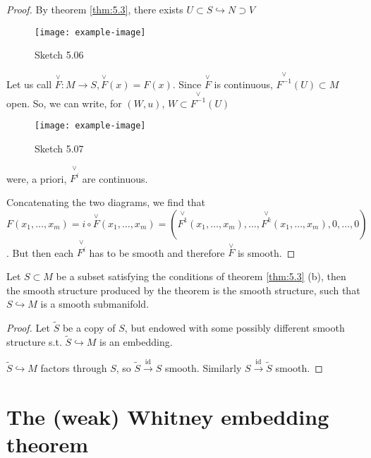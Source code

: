 \begin{proof} %
    By theorem \ref{thm:5.3}, there exists \(U\subset S\hookrightarrow N\supset V\)
    \begin{figure}[H]
        \centering
        \texttt{[image: example-image]}
        \caption{Sketch 5.06}
    \end{figure}
Let us call \(\stackrel{\vee}{F}:M\to S,\stackrel{\vee}{F}(x)=F(x)\). Since \(\stackrel{\vee}{F}\) 
is continuous, \(\stackrel{\vee}{F^{-1}}(U)\subset M\) open. So, we can write, for \((W,u)\), \(W\subset \stackrel{\vee}{F^{-1}}(U)\)
\begin{figure}[H]
    \centering
    \texttt{[image: example-image]}
    \caption{Sketch 5.07}
\end{figure}
were, a priori, \(\stackrel{\vee}{F^{i}}\) are continuous.

Concatenating the two diagrams, we find that \(F(x_1,\dots,x_m)=i\circ \stackrel{\vee}{F}(x_1,\dots,x_m)=(\stackrel{\vee}{F^1}(x_1,\dots,x_m),\dots,\stackrel{\vee}{F^k}(x_1,\dots,x_m),0,\dots,0)\).
But then each \(\stackrel{\vee}{F^i}\)  has to be smooth and therefore \(\stackrel{\vee}{F}\) is smooth.
\end{proof}

\begin{lemma}\label{lem:5.5}
    Let \(S\subset M\) be a subset satisfying the conditions of theorem \ref{thm:5.3} (b), then 
    the smooth structure produced by the theorem is the  smooth structure, such that \(S \hookrightarrow M\) 
    is a smooth submanifold.
\end{lemma}

\begin{proof}%
    Let \(\tilde{S}\) be a copy of \(S\), but endowed with some possibly different smooth structure s.t. \(\tilde{S}\hookrightarrow M\) 
    is an embedding.
    
    \(\tilde{S}\hookrightarrow M\) factors through \(S\), so \(\tilde{S}\stackrel{\text{id}}{\to} S\) smooth. Similarly \(S\stackrel{\text{id}}{\to} \tilde{S}\) smooth.
\end{proof}

\section{The (weak) Whitney embedding theorem}

